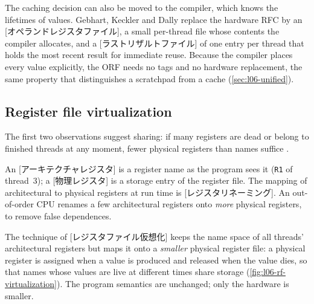 \documentclass[../main.tex]{subfiles}
\begin{document}
The caching decision can also be moved to the compiler, which knows the
lifetimes of values.  Gebhart, Keckler and Dally
\cite{gebhart2011compile} replace the hardware RFC by an
[オペランドレジスタファイル], a small
per-thread file whose contents the compiler allocates, and a
[ラストリザルトファイル] of one entry per
thread that holds the most recent result for immediate reuse.  Because the compiler places every value
explicitly, the ORF needs no tags and no hardware replacement, the same
property that distinguishes a scratchpad from a cache
(\cref{sec:l06-unified}).

\subsection{Register file virtualization}

The first two observations suggest sharing: if many registers are dead
or belong to finished threads at any moment, fewer physical registers
than names suffice \cite{jeon2015rfv}.

\begin{definition}
  \label{def:l06-arch-phys}
  An [アーキテクチャレジスタ] is a
  register name as the program sees it (\texttt{R1} of thread~3); a
  [物理レジスタ] is a storage entry of the
  register file.  The mapping of architectural to physical registers at
  run time is [レジスタリネーミング].  An
  out-of-order CPU
  renames a few architectural registers onto \emph{more} physical
  registers, to remove false dependences.
\end{definition}

\begin{definition}
  \label{def:l06-rf-virtualization}
  The technique of
  [レジスタファイル仮想化] keeps the
  name space of all threads' architectural registers but maps it onto a
  \emph{smaller} physical register file: a physical register is assigned
  when a value is produced and released when the value dies, so that
  names whose values are live at different times share storage
  (\cref{fig:l06-rf-virtualization}).  The program semantics are
  unchanged; only the hardware is smaller.
\end{definition}
\end{document}
